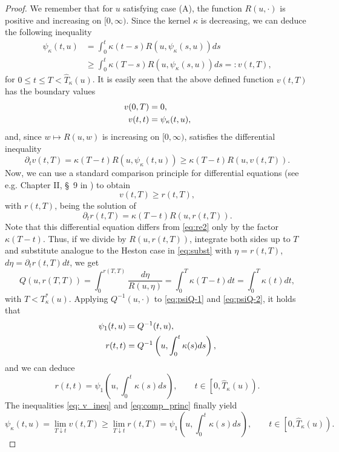 \documentclass[12pt,a4paper]{amsart}
\numberwithin{equation}{section}
\numberwithin{equation}{section}
\theoremstyle{nonumberplain}
\begin{document}
\begin{proof}
	 We remember that for $u $ satisfying case (A), the function $R(u,\cdot)$ is positive and increasing on $[0,\infty)$. Since the kernel $\kappa$ is decreasing, we can deduce the following inequality
	\begin{align}\label{eq: v_ineq}
		\psi_\kappa(t,u) &= \int_0^t \kappa(t-s) R(u,\psi_\kappa(s,u)) ds \nonumber \\ &\ge \int_0^t \kappa(T-s) R(u,\psi_\kappa(s,u)) ds =: v(t,T), 
	\end{align}
	for $0 \le t \le T < \hat{T}_\kappa(u)$. It is easily seen that the above defined function $v(t,T)$ has the boundary values
	\begin{align}\notag
	    v(0,T) &= 0, \\ \label{eq: v=psi_alpha}
		v(t,t) &= \psi_\kappa(t,u), 
	\end{align}
	and, since $w \mapsto R(u,w)$ is increasing on $[0,\infty)$, satisfies the differential inequality
	\begin{equation}\label{eq:v_dif_ineq}
		\partial_t v(t,T) = \kappa(T-t) R(u,\psi_\kappa(t,u)) \ge \kappa(T-t) R(u,v(t,T)).
	\end{equation}
	Now, we can use a standard comparison principle for differential equations (see e.g. Chapter II, \S \ 9 in \cite{browder1998ordinary}) to obtain
	\begin{equation}\label{eq:comp_princ}
		v(t,T)\ge r(t,T),
	\end{equation}
	with $r(t,T)$, being the solution of
		\begin{equation}\label{eq:r1}
		\partial_t r(t,T) = \kappa(T-t) R(u,r(t,T)).
	\end{equation}
	Note that this differential equation differs from \eqref{eq:re2} only by the factor $\kappa(T-t)$. Thus, if we divide by $R(u,r(t,T))$, integrate both sides up to $T$ and substitute analogue to the Heston case in \eqref{eq:subst} with $ \eta = r(t,T) $, $d\eta = \partial_t r(t,T) dt $, we get
	\begin{equation}\label{eq:psiQ-2}
		Q(u, r(T,T)) = \int_0^{r(T,T)} \frac{d\eta}{R(u,\eta)} = \int_0^T \kappa(T-t) dt = \int_0^T \kappa(t) dt ,	\end{equation}
		with $T < T_\kappa^*(u)$. Applying $Q^{-1}(u,\cdot)$ to \eqref{eq:psiQ-1} and \eqref{eq:psiQ-2}, it holds that
	\begin{align}\notag
	\psi_1(t,u) &= Q^{-1}(t,u), \\ \label{eq:r=Q}
		r(t,t) &= Q^{-1}\left( u,\int_0^t \kappa(s) ds \right),
	\end{align}
	and we can deduce
	\begin{equation}\label{eq:r=psi1}
		r(t,t) = \psi_1 \left( u,\int_0^t \kappa(s) ds \right), \qquad t \in \left[0,\hat{T}_\kappa(u)\right).
	\end{equation}
	The inequalities \eqref{eq: v_ineq} and \eqref{eq:comp_princ} finally yield
	\begin{equation}\label{eq:kappa_compare}
		\psi_\kappa(t,u) = \lim_{T \downarrow t} v(t,T) \ge \lim_{T \downarrow t} r(t,T) = \psi_1\left( u, \int_0^t \kappa (s)ds \right), \qquad t \in \left[0,\hat{T}_\kappa(u)\right).
	\end{equation}
	

\end{proof}
\end{document}
